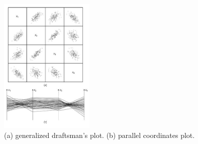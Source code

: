 \begin{mdframed}
\begin{multicols}{2}
    \begin{figure}[H]
        \centering
        \includegraphics[width=0.4\textwidth]{multivariate_vis.png}
        \caption{(a) generalized draftsman's plot. (b) parallel coordinates
        plot.}
    \end{figure}

\end{multicols}\end{mdframed}



